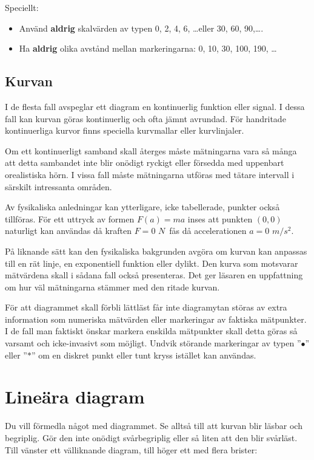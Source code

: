 \documentclass[onepage,swedish,a4paper,12pt]{scrbook}
\begin{document}
Speciellt:

\begin{itemize}
\item Använd \textbf{aldrig} skalvärden av typen 0, 2, 4, 6, \ldots eller 30, 60, 90,\ldots.
\item Ha \textbf{aldrig} olika avstånd mellan markeringarna: 0, 10, 30, 100, 190, \ldots

\end{itemize}


\subsection*{Kurvan}

I de flesta fall avspeglar ett diagram en kontinuerlig funktion eller signal. I dessa fall kan kurvan göras kontinuerlig och ofta jämnt avrundad. För handritade kontinuerliga kurvor finns speciella kurvmallar eller kurvlinjaler. 


Om ett kontinuerligt samband skall återges måste mätningarna vara så många att detta sambandet inte blir onödigt ryckigt eller försedda med uppen\-bart orealistiska hörn. I vissa fall måste mätningarna utföras med tätare intervall i särskilt intressanta områden.

Av fysikaliska anledningar kan ytterligare, icke tabellerade, punkter också tillföras. För ett uttryck av formen $F(a)=ma$ inses att punkten $(0,0)$ naturligt kan användas då kraften $F=0$ $N$ fås då accelerationen $a=0$ $m/s^2$.

På liknande sätt kan den fysikaliska bakgrunden avgöra om kurvan kan anpassas till en rät linje, en exponentiell funktion eller dylikt. Den kurva som motsvarar mätvärdena skall i sådana fall också presenteras. Det ger läsaren en uppfattning om hur väl mätningarna stämmer med den ritade kurvan.

För att diagrammet skall förbli lättläst får inte diagramytan störas av extra information som numeriska mätvärden eller markeringar av faktiska mätpunkter. I de fall man faktiskt önskar markera enskilda mätpunkter skall detta göras så varsamt och icke-invasivt som möjligt. Undvik störande markeringar av typen ''$\bullet$'' eller ''$\ast$'' om en diskret punkt eller tunt kryss istället kan användas. 

\section*{Lineära diagram}


Du vill förmedla något med diagrammet. Se alltså till att kurvan blir läsbar och begriplig. Gör den inte onödigt svårbegriplig eller så liten att den blir svårläst. Till vänster ett välliknande diagram, till höger ett med flera brister:
\end{document}
